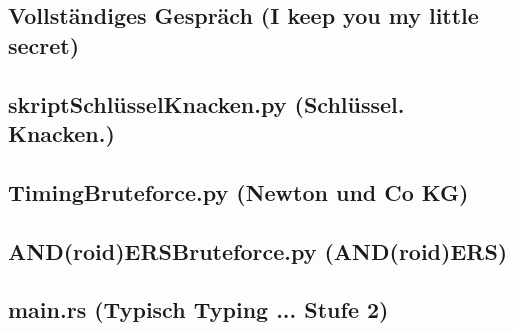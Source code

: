\documentclass[12pt, a4paper, titlepage, oneside]{scrartcl}
\begin{document}
	\subsection{Vollständiges Gespräch (I keep you my little secret)}
	

	\subsection{skriptSchlüsselKnacken.py (Schlüssel. Knacken.)}
	

	\subsection{TimingBruteforce.py (Newton und Co KG)}
	

    \subsection{AND(roid)ERSBruteforce.py (AND(roid)ERS)}
    

	\subsection{main.rs (Typisch Typing ... Stufe 2)}
	
	

\end{document}
